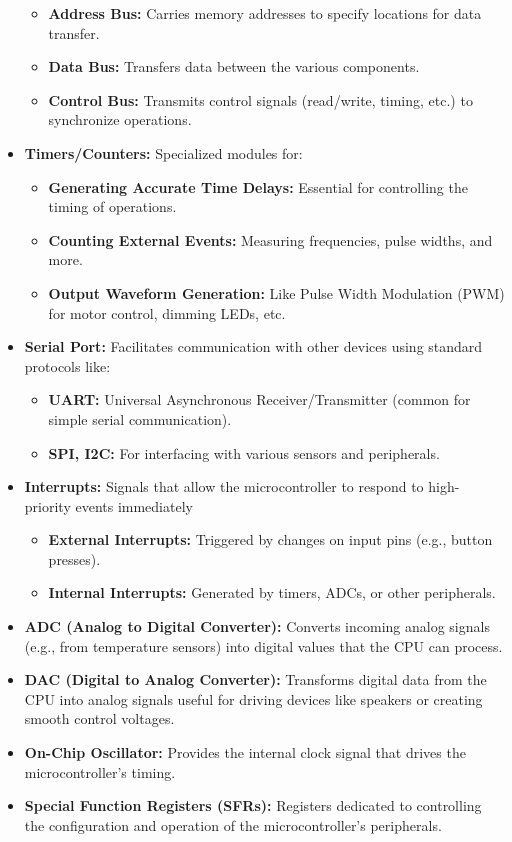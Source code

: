 \documentclass[
]{article}
\begin{document}
\begin{itemize}
  \begin{itemize}
  \item
    \textbf{Address Bus:} Carries memory addresses to specify locations
    for data transfer.
  \item
    \textbf{Data Bus:} Transfers data between the various components.
  \item
    \textbf{Control Bus:} Transmits control signals (read/write, timing,
    etc.) to synchronize operations.
  \end{itemize}
\item
  \textbf{Timers/Counters:} Specialized modules for:

  \begin{itemize}
  \item
    \textbf{Generating Accurate Time Delays:} Essential for controlling
    the timing of operations.
  \item
    \textbf{Counting External Events:} Measuring frequencies, pulse
    widths, and more.
  \item
    \textbf{Output Waveform Generation:} Like Pulse Width Modulation
    (PWM) for motor control, dimming LEDs, etc.
  \end{itemize}
\item
  \textbf{Serial Port:} Facilitates communication with other devices
  using standard protocols like:

  \begin{itemize}
  \item
    \textbf{UART:} Universal Asynchronous Receiver/Transmitter (common
    for simple serial communication).
  \item
    \textbf{SPI, I2C:} For interfacing with various sensors and
    peripherals.
  \end{itemize}
\item
  \textbf{Interrupts:} Signals that allow the microcontroller to respond
  to high-priority events immediately

  \begin{itemize}
  \item
    \textbf{External Interrupts:} Triggered by changes on input pins
    (e.g., button presses).
  \item
    \textbf{Internal Interrupts:} Generated by timers, ADCs, or other
    peripherals.
  \end{itemize}
\item
  \textbf{ADC (Analog to Digital Converter):} Converts incoming analog
  signals (e.g., from temperature sensors) into digital values that the
  CPU can process.
\item
  \textbf{DAC (Digital to Analog Converter):} Transforms digital data
  from the CPU into analog signals useful for driving devices like
  speakers or creating smooth control voltages.
\item
  \textbf{On-Chip Oscillator:} Provides the internal clock signal that
  drives the microcontroller's timing.
\item
  \textbf{Special Function Registers (SFRs):} Registers dedicated to
  controlling the configuration and operation of the microcontroller's
  peripherals.
\end{itemize}
\end{document}
